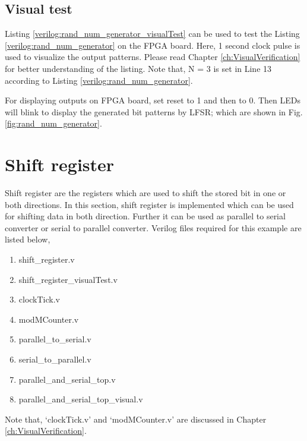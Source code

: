 

\subsection{Visual test}
Listing \ref{verilog:rand_num_generator_visualTest} can be used to test the Listing \ref{verilog:rand_num_generator} on the FPGA board. Here, 1 second clock pulse is used to visualize the output patterns. Please read Chapter \ref{ch:VisualVerification} for better understanding of the listing. Note that,  N = 3 is set in Line 13 according to Listing \ref{verilog:rand_num_generator}.

For displaying outputs on FPGA board, set reset to 1 and then to 0. Then LEDs will blink to display the generated bit patterns by LFSR; which are shown in Fig. \ref{fig:rand_num_generator}. 




\section{Shift register}
Shift register are the registers which  are used to shift the stored bit in one or both directions. In this section, shift register is implemented which can be used for shifting data in both direction. Further it can be used as parallel to serial converter or serial to parallel converter. Verilog files required for this example are listed below, 
\begin{enumerate}
	\item shift\_register.v
	\item shift\_register\_visualTest.v
	\item clockTick.v
	\item modMCounter.v
	\item parallel\_to\_serial.v
	\item serial\_to\_parallel.v
	\item parallel\_and\_serial\_top.v
	\item parallel\_and\_serial\_top\_visual.v
\end{enumerate}
Note that, `clockTick.v' and `modMCounter.v' are discussed in Chapter \ref{ch:VisualVerification}.


